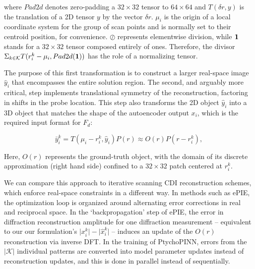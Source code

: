 \documentclass[sn-mathphys]{sn-jnl}%
\theoremstyle{thmstyleone}%
\theoremstyle{thmstyletwo}%
\theoremstyle{thmstylethree}%
\begin{document}
where $Pad2d$ denotes zero-padding a $32 \times 32$ tensor to $64 \times 64$ and $T(\delta r, y)$ is the translation of a 2D tensor $y$ by the vector $\delta r$. $\mu_i$ is the origin of a local coordinate system for the group of scan points and is normally set to their centroid position, for convenience. $\oslash$ represents elementwise division, while $\bf{1}$ stands for a $32 \times 32$ tensor composed entirely of ones. Therefore, the divisor $\Sigma_{k \in \mathcal{K}} T(r_i^k - \mu_i, Pad2d(\bf{1}))$ has the role of a normalizing tensor.

The purpose of this first transformation is to construct a larger real-space image $\hat{y}_i$ that encompasses the entire solution region. The second, and arguably more critical, step implements translational symmetry of the reconstruction, factoring in shifts in the probe location. This step also transforms the 2D object $\hat{y}_i$ into a 3D object that matches the shape of the autoencoder output $x_i$, which is the required input format for $F_d$:

\begin{equation}
\bar{y}_i^k = T(\mu_i - r_i^k, \hat{y}_i) P(r) \approx O(r) P(r - r_i^k),
\label{eq:2}
\end{equation}

Here, $O(r)$ represents the ground-truth object, with the domain of its discrete approximation (right hand side) confined to a $32 \times 32$ patch centered at $r_i^k$.


We can compare this approach to iterative scanning CDI reconstruction schemes, which enforce real-space constraints in a different way. In methods such as ePIE, the optimization loop is organized around alternating error corrections in real and reciprocal space. In the `backpropagation' step of ePIE, the error in diffraction reconstruction amplitude for one diffraction measurement -- equivalent to our our formulation's $\lvert x_i^k \rvert - \lvert \hat{x}_i^k \rvert $ -- induces an update of the $O(r)$ reconstruction via inverse DFT. In the training of PtychoPINN, errors from the $\vert \mathcal{K} \vert$ individual patterns are converted into model parameter updates instead of reconstruction updates, and this is done in parallel instead of sequentially.

\end{document}
